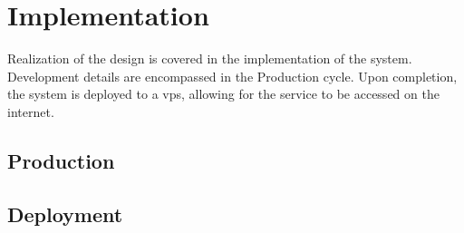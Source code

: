 \section{Implementation}
Realization of the design is covered in the implementation of the system.
Development details are encompassed in the Production cycle.
Upon completion, the system is deployed to a \Ac{vps}, allowing for the service to be accessed on the internet.

\subsection{Production}

\subsection{Deployment}

